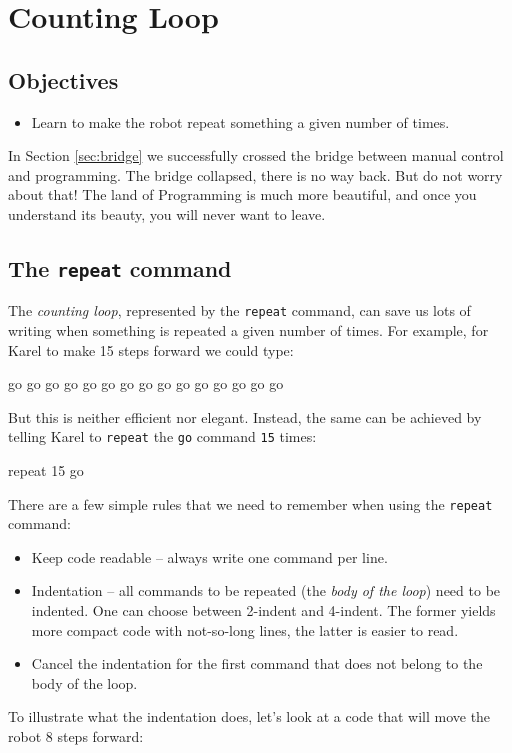 \section{Counting Loop} \label{sec:repeat}

\subsection{Objectives} 

\begin{itemize}
\item Learn to make the robot repeat something a given number of times.
\end{itemize}

\noindent
In Section \ref{sec:bridge} we successfully crossed the bridge between manual control 
and programming. The bridge collapsed, there is no way back. But do 
not worry about that! The land of Programming is much more beautiful,
and once you understand its beauty, you will never want to leave.

\subsection{The {\tt repeat} command}

The {\em counting loop}, represented by the {\tt repeat} command, can save 
us lots of writing when something is repeated a given number of times. 
For example, for Karel to make 15 steps forward we could type:

\begin{bluecode}
go
go
go
go
go
go
go
go
go
go
go
go
go
go
go
\end{bluecode}
But this is neither efficient nor elegant. Instead, the same can be
achieved by telling Karel to {\tt repeat} the {\tt go} command {\tt 15} times:

\begin{bluecode}
repeat 15
    go
\end{bluecode}
There are a few simple rules that we need to remember when using the {\tt repeat} command:

\begin{itemize}
\item Keep code readable -- always write one command per line.
\item Indentation -- all commands to be repeated (the {\em body of the loop}) need to be indented. 
      One can choose between 2-indent and 4-indent. The former yields more compact 
      code with not-so-long lines, the latter is easier to read. 
\item Cancel the indentation for the first command that does not belong to the body of the loop.
\end{itemize}
To illustrate what the indentation does, let's look at a code that will move the robot 8 steps forward:

